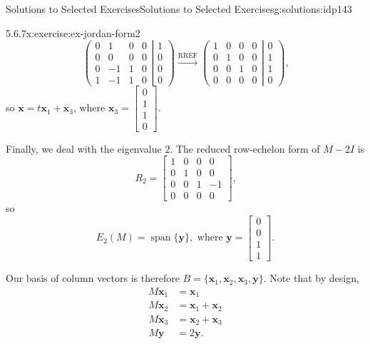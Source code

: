 \documentclass[oneside,10pt,]{book}
\numberwithin{equation}{section}
\newcommand{\spn}{\operatorname{span}}
\newcommand{\bbm}{\begin{bmatrix}}
\newcommand{\ebm}{\end{bmatrix}}
\newcommand{\xx}{\mathbf{x}}
\newcommand{\yy}{\mathbf{y}}
\newcommand{\amp}{&}
\begin{document}
\begin{solutions-chapter}{Solutions to Selected Exercises}{}{Solutions to Selected Exercises}{}{}{g:solutions:idp143}
\begin{inlinesolution}{5.6.7}{}{x:exercise:ex-jordan-form2}
\begin{equation*}
\left(\begin{matrix}0\amp 1\amp 0\amp 0\\0\amp 0\amp 0\amp 0\\0\amp -1\amp 1\amp 0\\1\amp -1\amp 1\amp 0\end{matrix}\right|\left.\begin{matrix}1\\0\\0\\0\end{matrix}\right)
\xrightarrow{\text{RREF}}
\left(\begin{matrix} 1\amp 0\amp 0\amp 0\\0\amp 1\amp 0\amp 0\\0\amp 0\amp 1\amp 0\\0\amp 0\amp 0\amp 0\end{matrix}\right|\left.\begin{matrix}0\\1\\1\\0\end{matrix}\right)\text{,}
\end{equation*}
so \(\xx = t\xx_1+\xx_3\), where \(\xx_3 =\bbm 0\\1\\1\\0\ebm\).%
\par
Finally, we deal with the eigenvalue \(2\). The reduced row-echelon form of \(M-2I\) is%
\begin{equation*}
R_2 = \bbm 1\amp 0\amp 0\amp 0\\0\amp 1\amp 0\amp 0\\0\amp 0\amp 1\amp -1\\0\amp 0\amp 0\amp 0\ebm\text{,}
\end{equation*}
so%
\begin{equation*}
E_2(M) = \spn\{\yy\}, \text{ where } \yy = \bbm 0\\0\\1\\1\ebm\text{.}
\end{equation*}
%
\par
Our basis of column vectors is therefore \(B=\{\xx_1,\xx_2,\xx_3,\yy\}\). Note that by design,%
\begin{align*}
M\xx_1 \amp =\xx_1\\
M\xx_2 \amp =\xx_1+\xx_2\\
M\xx_3 \amp= \xx_2+\xx_3\\
M\yy \amp = 2\yy\text{.}

\end{align*}
\end{inlinesolution}
\end{solutions-chapter}
\end{document}
